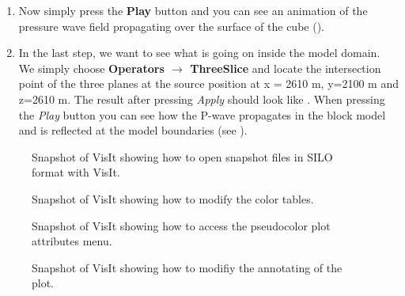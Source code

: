 \documentclass[11pt,onecolumn,oneside]{article}
\begin{document}
\begin{enumerate}
\item Now simply press the {\bf{Play}} button and you can see an animation of the pressure wave field propagating over the surface of the cube ().      

\item In the last step, we want to see what is going on inside the model domain. We simply choose {\bf{Operators $\rightarrow$ ThreeSlice}} and locate the intersection point of the three planes at the source position at x = 2610 m, y=2100 m and z=2610 m. The result after pressing \textit{Apply} should look like . When pressing the \textit{Play} button you can see how the P-wave propagates in the block model and is reflected at the model boundaries (see ). 

\end{enumerate}

\begin{figure}[ht]
\begin{center}
\caption{\label{open_file.pdf} Snapshot of VisIt showing how to open snapshot files in SILO format with VisIt.}
\end{center}
\end{figure}

\begin{figure}[ht]
\begin{center}
\caption{\label{seismic_color_table.pdf} Snapshot of VisIt showing how to modify the color tables.}
\end{center}
\end{figure}

\begin{figure}[ht]
\begin{center}
\caption{\label{pseudo_color_attrib.pdf} Snapshot of VisIt showing how to access the pseudocolor plot attributes menu.}
\end{center}
\end{figure}

\begin{figure}[ht]
\begin{center}
\caption{\label{slider_annotation.pdf} Snapshot of VisIt showing how to modifiy the annotating of the plot.}
\end{center}
\end{figure}
\end{document}
